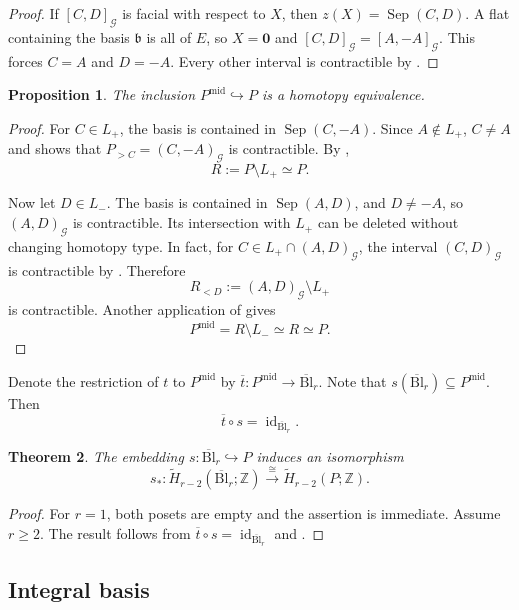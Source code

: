 \documentclass[10pt]{amsart}
\theoremstyle{plain}
\newtheorem{theorem}{Theorem}[section]
\newtheorem{proposition}[theorem]{Proposition}
\theoremstyle{definition}
\newcommand{\zero}{\mathbf{0}}
\newcommand{\ZZ}{\mathbb{Z}}
\newcommand{\G}{\mathcal{G}}
\DeclareMathOperator{\id}{id}
\newcommand{\Bl}{\mathrm{Bl}}
\newcommand{\Sep}{\operatorname{Sep}}
\newcommand{\bb}{\mathfrak{b}}
\begin{document}
\begin{proof}
If $[C,D]_{\G}$ is facial with respect to $X$, then $z(X)=\Sep(C,D)$. A flat containing the basis $\bb$ is all of $E$, so $X=\zero$ and $[C,D]_{\G}=[A,-A]_{\G}$. This forces $C=A$ and $D=-A$. Every other interval is contractible by .
\end{proof}

\begin{proposition}\label{mid-homotopy}
The inclusion $P^{\mathrm{mid}}\hookrightarrow P$ is a homotopy equivalence.
\end{proposition}

\begin{proof}
For $C\in L_+$, the basis is contained in $\Sep(C,-A)$. Since $A\not\in L_+$, $C\neq A$ and  shows that $P_{>C}=(C,-A)_{\G}$ is contractible. By ,
\[
R:=P\setminus L_+\simeq P.
\]

Now let $D\in L_-$. The basis is contained in $\Sep(A,D)$, and $D\neq -A$, so $(A,D)_{\G}$ is contractible. Its intersection with $L_+$ can be deleted without changing homotopy type. In fact, for $C\in L_+\cap(A,D)_{\G}$, the interval $(C,D)_{\G}$ is contractible by . Therefore
\[
R_{<D}:=(A,D)_{\G}\setminus L_+
\]
is contractible. Another application of  gives
\[
P^{\mathrm{mid}}=R\setminus L_-\simeq R\simeq P.
\]
\end{proof}

Denote the restriction of $t$ to $P^{\mathrm{mid}}$ by $\overline{t}:P^{\mathrm{mid}}\to\overline{\Bl}_r$. Note that $s(\overline{\Bl}_r)\subseteq P^{\mathrm{mid}}$. Then
\[
\overline{t}\circ s=\id_{\overline{\Bl}_r}.
\]

\begin{theorem}\label{basis-thm}
The embedding $s:\overline{\Bl}_r\hookrightarrow P$ induces an isomorphism
\[
s_*:\widetilde H_{r-2}(\overline{\Bl}_r;\ZZ)\xrightarrow{\cong}\widetilde H_{r-2}(P;\ZZ).
\]
\end{theorem}

\begin{proof}
For $r=1$, both posets are empty and the assertion is immediate. Assume $r\ge2$. The result follows from $\overline{t}\circ s=\id_{\overline{\Bl}_r}$ and .
\end{proof}

\subsection{Integral basis}
\end{document}
